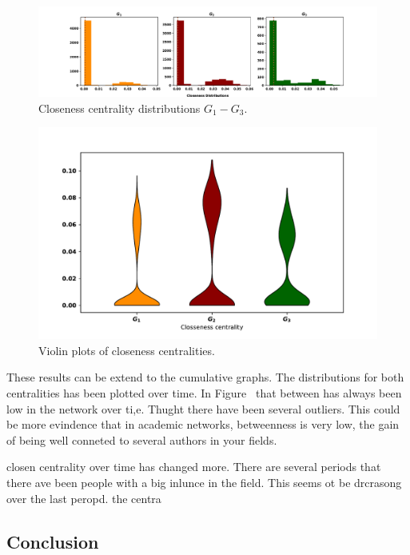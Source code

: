 \documentclass{article}
\theoremstyle{definition}
\begin{document}
\begin{figure}[!hbtp]
    \centering
    \includegraphics[width=\textwidth]{./assets/images/closeness_distributions.pdf}
    \caption{Closeness centrality distributions  \(G_1- G_3\).}\label{fig:closeness_dist}
\end{figure}

\begin{figure}[!hbtp]
    \centering
    \includegraphics[width=.7\textwidth]{./assets/images/closeness_violins.pdf}
    \caption{Violin plots of closeness centralities.}\label{fig:violin_closeness}
\end{figure}

These results can be extend to the cumulative graphs. The distributions for both
centralities has been plotted over time. In Figure~ that between has always
been low in the network over ti,e. Thught there have been several outliers.
This could be more evindence that in academic networks, betweenness is very low,
the gain of being well conneted to several authors in your fields.

closen centrality over time has changed more. There are several periods that
there ave been people with a big inlunce in the field. This seems ot be drcrasong
over the last peropd. 
the centra

\subsection{Conclusion}

\newpage


\end{document}
